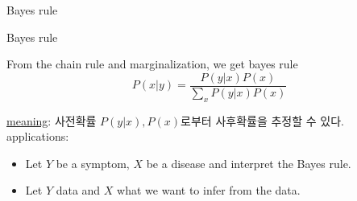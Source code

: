 \documentclass[9pt]{beamer}
\begin{document}
    \begin{section}{Bayes rule}
      \begin{frame}{Bayes rule}
        \begin{theorem}
          From the chain rule and marginalization, we get bayes rule
          $$ P(x|y)=\frac{{P}(y|x) {P}(x)}{\sum_x {P}(y | x) {P}(x)} $$ 
        \end{theorem}
        \checkmark \underline{meaning}: 사전확률 $P(y|x), P(x)$로부터 사후확률을 추정할 수 있다. \\
        \vspace{0.4cm}
        applications:
        \begin{itemize}
          \item Let $Y$ be a symptom, $X$ be a disease and interpret the Bayes rule.
          \item Let $Y$ data and $X$ what we want to infer from the data.
        \end{itemize}
        \vspace{2cm}
      \end{frame}
    \end{section}
\end{document}
